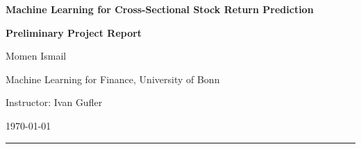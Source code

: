 \documentclass[11pt,a4paper]{article}
\newcommand{\papertitle}
  {Machine Learning for Cross-Sectional Stock Return Prediction}
\begin{document}

\begin{center}
  {\LARGE\bfseries \papertitle\par}

  \vspace{0.35em}

  {\large\bfseries Preliminary Project Report\par}

  \vspace{0.7em}

  {\large Momen Ismail\par}

  \vspace{0.25em}

  {Machine Learning for Finance, University of Bonn\par}

  {Instructor: Ivan Gufler\par}

  \vspace{0.35em}

  {\today\par}
\end{center}

\vspace{0.6em}
\hrule
\vspace{0.8em}


\begin{abstract}
\noindent
This paper compares linear, regularized, dimension-reduction and tree-based
methods for predicting next-month stock excess returns. The models are
evaluated using a chronological design that separates model selection from a
2020--2025 test period. Partial Least Squares produces the lowest preliminary
test-period mean squared error and an out-of-sample \(R^2\) of approximately
\(0.18\%\). Random Forest and a parsimonious three-variable OLS model also
slightly outperform the historical-mean benchmark. Elastic Net selects no
nonzero coefficients and effectively reproduces the benchmark, while the
single Decision Tree performs substantially worse. The results illustrate
that machine-learning flexibility does not automatically translate into
reliable stock-return forecasts and that small improvements must be interpreted
cautiously. These estimates are preliminary: a project audit identified target
continuity, macro-timing and workflow-documentation issues that will be
corrected before a complete clean rebuild.
\end{abstract}
\end{document}
